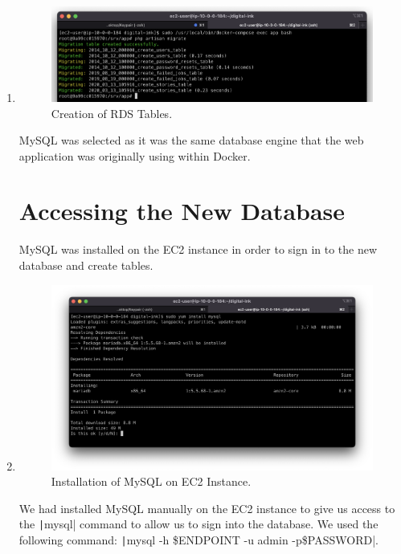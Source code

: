 \begin{enumerate}
    \item
    \begin{figure}[H]
        \centering
        \includegraphics[width=\textwidth]{resources/rds/rds-tables-creation}
        \caption{Creation of RDS Tables.}
        \label{fig:rds-tables}
    \end{figure}\nolinebreak
    MySQL was selected as it was the same database engine that the web application was originally using within Docker.

    \section{Accessing the New Database}\label{sec:accessing-the-new-database}
    MySQL was installed on the EC2 instance in order to sign in to the new database and create tables.

    \item
    \begin{figure}[H]
    \centering
    \includegraphics[width=\textwidth]{resources/rds/rds-mysql-install}
    \caption{Installation of MySQL on EC2 Instance.}
    \label{fig:rds-msql-install}
    \end{figure}\nolinebreak
    We had installed MySQL manually on the EC2 instance to give us access to the \texttt|mysql| command to allow us to sign into the database. We used the following command: \texttt|mysql -h \$ENDPOINT -u admin -p\$PASSWORD|.


\end{enumerate}
